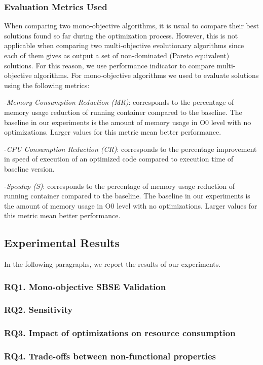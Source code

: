 \subsubsection{Evaluation Metrics Used}
When comparing two mono-objective algorithms, it is usual to
compare their best solutions found so far during the optimization
process. However, this is not applicable when comparing two multi-objective
evolutionary algorithms since each of them gives as output
a set of non-dominated (Pareto equivalent) solutions. For this reason,
we use performance indicator to compare multi-objective algorithms.
For mono-objective algorithms we used to evaluate solutions using the following metrics:

-\textit{Memory Consumption Reduction (MR)}: corresponds to the percentage of memory usage reduction of running container compared to the baseline. The baseline in our experiments is the amount of memory usage in O0 level with no optimizations. Larger values for this metric mean better performance. 

-\textit{CPU Consumption Reduction (CR)}: corresponds to the percentage improvement in speed of execution of an optimized code compared to execution time of baseline version.

-\textit{Speedup (S)}: corresponds to the percentage of memory usage reduction of running container compared to the baseline. The baseline in our experiments is the amount of memory usage in O0 level with no optimizations. Larger values for this metric mean better performance.
\subsection{Experimental Results}
In the following paragraphs, we report the results of our experiments.
\subsubsection{RQ1. Mono-objective SBSE Validation}
\subsubsection{RQ2. Sensitivity}
\subsubsection{RQ3. Impact of optimizations on resource consumption}
\subsubsection{RQ4. Trade-offs between non-functional properties}
